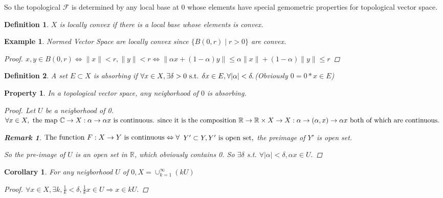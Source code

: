 \documentclass{article}
\newtheorem*{property}{Property}
\newtheorem*{definition}{Definition}
\newtheorem*{remark}{Remark}
\newtheorem*{example}{Example}
\newtheorem*{corollary}{Corollary}
\begin{document}
  So the topological $\mathcal{F}$ is determined by any local base at $0$ 
  whose elements have special gemometric properties for topological vector space.
\begin{definition}
  $X$ is locally convex if there is a local base whose elements is convex.
\end{definition}
\begin{example}
  Normed Vector Space are locally convex since $\{B(0, r) \mid r > 0\}$ are convex.
  \begin{proof}
    $
    x, y \in B(0, r) \Leftrightarrow \|x\| < r, \|y\| < r \Leftrightarrow 
    \|\alpha x + (1 - \alpha)y\| \le \alpha\|x\| + (1 - \alpha)\|y\| \le r
    $
  \end{proof}
\end{example}
\begin{definition}
  A set $E \subset X$ is absorbing if 
  $
  \forall x \in X, \exists \delta > 0 \textnormal{ s.t. } \delta x \in E, 
  \forall |\alpha| < \delta.
$(Obviously $0 = 0 * x \in E$)
  
\end{definition}

\begin{property}
In a topological vector space, any neigborhood of $0$ is absorbing.
\begin{proof}
  Let $U$ be a neigborhood of 0. 
  $
  \forall x \in X, \textnormal{ the map } \mathbb{C} \rightarrow X: 
  \alpha \rightarrow \alpha x
  \textnormal{ is continuous. since it is the composition }
  \mathbb{R} \rightarrow \mathbb{R} \times X \rightarrow X: 
  \alpha \rightarrow (\alpha, x) \rightarrow \alpha x 
  \textnormal{ both of which are continuous. }
  $
  \begin{remark}
    $
    \textnormal{The function } F: X \rightarrow Y 
    \textnormal{ is continuous} \Leftrightarrow 
    \forall     
    $
    $
    Y' \subset Y, Y' \textnormal{ is open set,}
    $
    the preimage of $Y'$ is open set. 
  \end{remark}
  So the pre-image of $U$ is an open set in $\mathbb{R}$, which obviously contains 0.
  So $\exists \delta$ s.t. $\forall |\alpha| < \delta, \alpha x \in U.$
\end{proof}
\end{property}
\begin{corollary}
  For any neigborhood $U$ of $0, X = \cup_{k=1}^{\infty}(kU)$
  \begin{proof}
    $
      \forall x \in X, \exists k, 
      \frac{1}{k} < \delta, \frac{1}{k} x \in U \Rightarrow x \in kU.
    $
  \end{proof}
\end{corollary}
\end{document}
